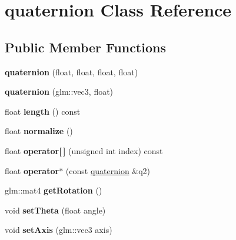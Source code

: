 \hypertarget{classquaternion}{\section{quaternion Class Reference}
\label{classquaternion}
}
\subsection*{Public Member Functions}
\begin{DoxyCompactItemize}
\item 
\hypertarget{classquaternion_aeeae08c99a1a1a468c8019c79a739970}{{\bfseries quaternion} (float, float, float, float)}\label{classquaternion_aeeae08c99a1a1a468c8019c79a739970}

\item 
\hypertarget{classquaternion_ac4d4727a93ba2fe342cdffffb16571d0}{{\bfseries quaternion} (glm\-::vec3, float)}\label{classquaternion_ac4d4727a93ba2fe342cdffffb16571d0}

\item 
\hypertarget{classquaternion_a624e8fb15673f3c2e0a9947c1d0c80af}{float {\bfseries length} () const }\label{classquaternion_a624e8fb15673f3c2e0a9947c1d0c80af}

\item 
\hypertarget{classquaternion_a2ae74539ef1abaf7c3604b5d6b0d4b41}{float {\bfseries normalize} ()}\label{classquaternion_a2ae74539ef1abaf7c3604b5d6b0d4b41}

\item 
\hypertarget{classquaternion_a8d1159740f9f699e91e5cc7f645759ce}{float {\bfseries operator\mbox{[}$\,$\mbox{]}} (unsigned int index) const }\label{classquaternion_a8d1159740f9f699e91e5cc7f645759ce}

\item 
\hypertarget{classquaternion_ad26fbe0fb2883f8039572ef307749b97}{float {\bfseries operator$\ast$} (const \hyperlink{classquaternion}{quaternion} \&q2)}\label{classquaternion_ad26fbe0fb2883f8039572ef307749b97}

\item 
\hypertarget{classquaternion_a661ce0592a42bbef910f1176ae8ccb2c}{glm\-::mat4 {\bfseries get\-Rotation} ()}\label{classquaternion_a661ce0592a42bbef910f1176ae8ccb2c}

\item 
\hypertarget{classquaternion_a7f74bcfb2706f0604d50b16be56af209}{void {\bfseries set\-Theta} (float angle)}\label{classquaternion_a7f74bcfb2706f0604d50b16be56af209}

\item 
\hypertarget{classquaternion_a8f4b32b87f25deab885d38d181e5c9a7}{void {\bfseries set\-Axis} (glm\-::vec3 axis)}\label{classquaternion_a8f4b32b87f25deab885d38d181e5c9a7}

\end{DoxyCompactItemize}
